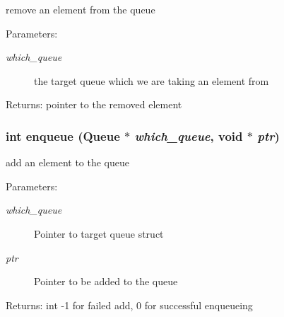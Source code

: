 remove an element from the queue \begin{Desc}
\item[Parameters:]
\begin{description}
\item[{\em which\_\-queue}]the target queue which we are taking an element from \end{description}
\end{Desc}
\begin{Desc}
\item[Returns:]pointer to the removed element \end{Desc}
\subsubsection{\setlength{\rightskip}{0pt plus 5cm}int enqueue (\bf{Queue} $\ast$ {\em which\_\-queue}, void $\ast$ {\em ptr})}\label{queue_8c_b5f34276406bb4ca11d16f5d4c608b33}


add an element to the queue \begin{Desc}
\item[Parameters:]
\begin{description}
\item[{\em which\_\-queue}]Pointer to target queue struct \item[{\em ptr}]Pointer to be added to the queue \end{description}
\end{Desc}
\begin{Desc}
\item[Returns:]int -1 for failed add, 0 for successful enqueueing \end{Desc}
